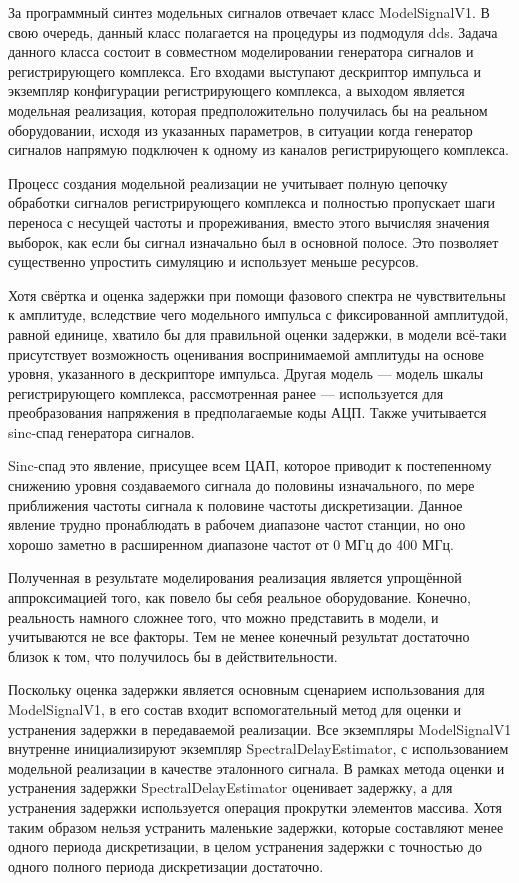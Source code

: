 \documentclass{report}
\begin{document}
За программный синтез модельных сигналов отвечает класс ModelSignalV1. В свою очередь, данный класс полагается на процедуры из подмодуля dds. Задача данного класса состоит в совместном моделировании генератора сигналов и регистрирующего комплекса. Его входами выступают дескриптор импульса и экземпляр конфигурации регистрирующего комплекса, а выходом является модельная реализация, которая предположительно получилась бы на реальном оборудовании, исходя из указанных параметров, в ситуации когда генератор сигналов напрямую подключен к одному из каналов регистрирующего комплекса.

Процесс создания модельной реализации не учитывает полную цепочку обработки сигналов регистрирующего комплекса и полностью пропускает шаги переноса с несущей частоты и прореживания, вместо этого вычисляя значения выборок, как если бы сигнал изначально был в основной полосе. Это позволяет существенно упростить симуляцию и использует меньше ресурсов.

Хотя свёртка и оценка задержки при помощи фазового спектра не чувствительны к амплитуде, вследствие чего  модельного импульса с фиксированной амплитудой, равной единице, хватило бы для правильной оценки задержки, в модели всё-таки присутствует возможность оценивания воспринимаемой амплитуды на основе уровня, указанного в дескрипторе импульса. Другая модель --- модель шкалы регистрирующего комплекса, рассмотренная ранее --- используется для преобразования напряжения в предполагаемые коды АЦП. Также учитывается sinc-спад генератора сигналов.

Sinc-спад это явление, присущее всем ЦАП, которое приводит к постепенному снижению уровня создаваемого сигнала до половины изначального, по мере приближения частоты сигнала к половине частоты дискретизации. Данное явление трудно пронаблюдать в рабочем диапазоне частот станции, но оно хорошо заметно в расширенном диапазоне частот от 0 МГц до 400 МГц.

Полученная в результате моделирования реализация является упрощённой аппроксимацией того, как повело бы себя реальное оборудование. Конечно, реальность намного сложнее того, что можно представить в модели, и учитываются не все факторы. Тем не менее конечный результат достаточно близок к том, что получилось бы в действительности.

Поскольку оценка задержки является основным сценарием использования для ModelSignalV1, в его состав входит вспомогательный метод для оценки и устранения задержки в передаваемой реализации. Все экземпляры ModelSignalV1 внутренне инициализируют экземпляр SpectralDelayEstimator, с использованием модельной реализации в качестве эталонного сигнала. В рамках метода оценки и устранения задержки SpectralDelayEstimator оценивает задержку, а для устранения задержки используется операция прокрутки элементов массива. Хотя таким образом нельзя устранить маленькие задержки, которые составляют менее одного периода дискретизации, в целом устранения задержки с точностью до одного полного периода дискретизации достаточно.
\end{document}
